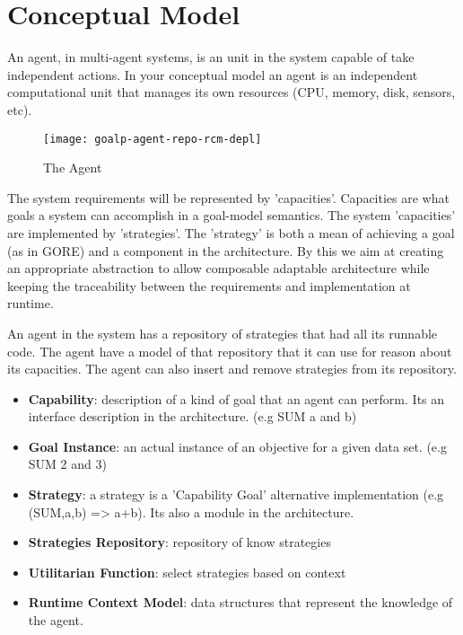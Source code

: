 \section{Conceptual Model}
\label{conceptual_model}

An agent, in multi-agent systems, is an unit in the system capable of take independent actions. In your conceptual model an agent is an independent computational unit that manages its own resources (CPU, memory, disk, sensors, etc).

\begin{figure}
  \centering
  \texttt{[image: goalp-agent-repo-rcm-depl]}
  \caption{The Agent}
  \label{fig:goalp-agent}
\end{figure}



The system requirements will be represented by 'capacities'. Capacities are what goals a system can accomplish in a goal-model semantics. The system 'capacities' are implemented by 'strategies'.
The 'strategy' is both a mean of achieving a goal (as in GORE) and a component in the architecture. By this we aim at creating an appropriate abstraction to allow composable adaptable architecture while keeping the traceability between the requirements and implementation at runtime.

An agent in the system has a repository of strategies that had all its runnable code. The agent have a model of that repository that it can use for reason about its capacities. The agent can also insert and remove strategies from its repository.

\begin{itemize}
  \item \textbf{Capability}: description of a kind of goal that an agent can perform.   Its an interface description in the architecture. (e.g SUM a and b)
  \item \textbf{Goal Instance}: an actual instance of an objective for a given data set. (e.g SUM 2 and 3)
  \item \textbf{Strategy}: a strategy is a 'Capability Goal' alternative implementation (e.g (SUM,a,b) => {a+b}). Its also a module in the architecture.
  \item \textbf{Strategies Repository}: repository of know strategies
  \item \textbf{Utilitarian Function}: select strategies based on context
  \item \textbf{Runtime Context Model}: data structures that represent the knowledge of the agent.
\end{itemize}

